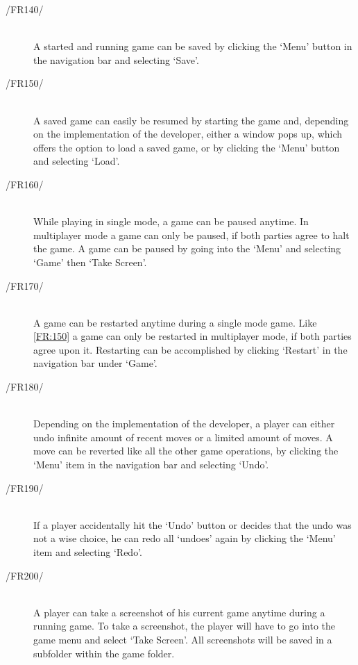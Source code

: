 \begin{description}
  	\item[/FR140/\label{FR:140}] {\bf {}}  \\
  	A started and running game can be saved by clicking the `Menu' button in the navigation bar and selecting `Save'.
 	\item[/FR150/\label{FR:150}] {\bf {}}  \\
 	A saved game can easily be resumed by starting the game and, depending on the implementation of the developer, either a window pops up, which offers the option to load a saved game, or by clicking the `Menu' button and selecting `Load'.
	\item[/FR160/\label{FR:160}] {\bf {}}  \\
	While playing in single mode, a game can be paused anytime. In multiplayer mode a game can only be paused, if both parties agree to halt the game. A game can be paused by going into the `Menu' and selecting `Game' then `Take Screen'.
	\item[/FR170/\label{FR:170}] {\bf {}}  \\
	A game can be restarted anytime during a single mode game. Like \ref{FR:150} a game can only be restarted in multiplayer mode, if both parties agree upon it. Restarting can be accomplished by clicking `Restart' in the navigation bar under `Game'.
	\item[/FR180/\label{FR:180}] {\bf {}}  \\
	Depending on the implementation of the developer, a player can either undo infinite amount of recent moves or a limited amount of moves. A move can be reverted like all the other game operations, by clicking the `Menu' item in the navigation bar and selecting `Undo'.
	\item[/FR190/\label{FR:190}] {\bf {}} \\
	If a player accidentally hit the `Undo' button or decides that the undo was not a wise choice, he can redo all `undoes' again by clicking the `Menu' item and selecting `Redo'.
	\item[/FR200/\label{FR:200}] {\bf {}} \\
	A player can take a screenshot of his current game anytime during a running game. To take a screenshot, the player will have to go into the game menu and select `Take Screen'. All screenshots will be saved in a subfolder within the game folder.
\end{description}

